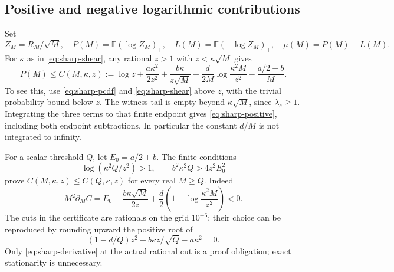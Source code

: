 \documentclass[11pt]{article}
\theoremstyle{definition}\newtheorem{definition}[theorem]{Definition}
\theoremstyle{remark}\newtheorem{remark}[theorem]{Remark}
\newcommand{\E}{\mathbb E}
\begin{document}
\subsection{Positive and negative logarithmic contributions}
Set
\[
 Z_M=R_M/\sqrt M,\quad P(M)=\E(\log Z_M)_+,\quad
 L(M)=\E(-\log Z_M)_+,\quad \mu(M)=P(M)-L(M).
\]
For \(\kappa\) as in \eqref{eq:sharp-shear}, any rational \(z>1\)
with \(z<\kappa\sqrt M\) gives
\[
 P(M)\le C(M,\kappa,z)
 :=\log z+\frac{a\kappa^2}{2z^2}
 +\frac{b\kappa}{z\sqrt M}
 +\frac d{2M}\log\frac{\kappa^2M}{z^2}
 -\frac{a/2+b}{M}.                                                   \tag{S4}\label{eq:sharp-positive}
\]
To see this, use \eqref{eq:sharp-pcdf} and
\eqref{eq:sharp-shear} above \(z\), with the trivial probability bound
below \(z\). The witness tail is empty beyond \(\kappa\sqrt M\), since
\(\lambda_s\ge1\). Integrating the three terms to that finite endpoint
gives \eqref{eq:sharp-positive}, including both endpoint subtractions.
In particular the constant \(d/M\) is not integrated to infinity.

For a scalar threshold \(Q\), let \(E_0=a/2+b\). The finite conditions
\[
 \log(\kappa^2Q/z^2)>1,\qquad
 b^2\kappa^2Q>4z^2E_0^2                                              \tag{S5}\label{eq:sharp-derivative}
\]
prove \(C(M,\kappa,z)\le C(Q,\kappa,z)\) for every real \(M\ge Q\).
Indeed
\[
 M^2\partial_M C=E_0-\frac{b\kappa\sqrt M}{2z}
 +\frac d2\left(1-\log\frac{\kappa^2M}{z^2}\right)<0 .
\]
The cuts in the certificate are rationals on the grid \(10^{-6}\);
their choice can be reproduced by rounding upward the positive root of
\[
 (1-d/Q)z^2-b\kappa z/\sqrt Q-a\kappa^2=0 .
\]
Only \eqref{eq:sharp-derivative} at the actual rational cut is a proof
obligation; exact stationarity is unnecessary.
\end{document}
